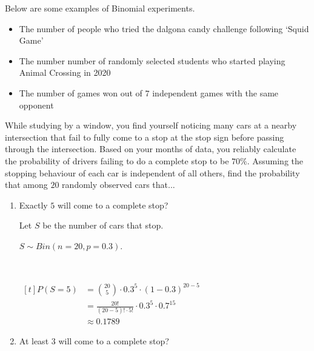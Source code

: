 \begin{example}
    Below are some examples of Binomial experiments. 

    \begin{itemize}
        \item The number of people who tried the dalgona candy challenge following `Squid Game'
        \item The number number of randomly selected students who started playing Animal Crossing in 2020
        \item The number of games won out of $7$ independent games with the same opponent
    \end{itemize}
\end{example}

\begin{example}
    While studying by a window, you find yourself noticing many cars at a nearby intersection that fail to fully come to a stop at the stop sign before passing through the intersection. Based on your months of data, you reliably calculate the probability of drivers failing to do a complete stop to be $70\%$. Assuming the stopping behaviour of each car is independent of all others, find the probability that among $20$ randomly observed cars that...

    \begin{enumerate}[label=\alph*)]
        \item Exactly $5$ will come to a complete stop? 
        
        Let $S$ be the number of cars that stop. 

        $S \sim Bin(n = 20, p = 0.3)$. 

        {~~~}
        
        $\begin{aligned}[t]
            P(S = 5) & = \binom{20}{5} \cdot 0.3^5 \cdot (1 - 0.3)^{20-5}              \\
                     & = \frac{20!}{(20-5)! \cdot 5!} \cdot 0.3^5 \cdot 0.7^{15} \\
                     & \approx 0.1789
        \end{aligned}$

        \item At least $3$ will come to a complete stop?
        

\end{enumerate}
\end{example}
